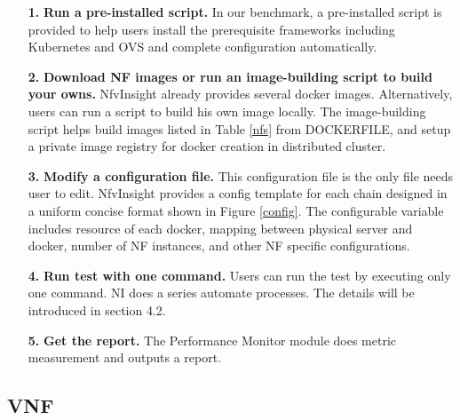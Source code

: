 \begin{itemize}
\item[\textbf{1.}]{}\textbf{Run a pre-installed script.}
In our benchmark, a pre-installed script is provided to
help users install the prerequisite frameworks including Kubernetes and OVS
and complete configuration automatically.

\item[\textbf{2.}]{}\textbf{Download NF images or run an image-building script to build your owns.}
NfvInsight already provides several docker images. Alternatively, users can run a script to build
his own image locally. The image-building script helps build images listed in Table \ref{nfs} from DOCKERFILE, and setup a private image registry for docker creation in distributed cluster.

\item[\textbf{3.}]{}\textbf{Modify a configuration file.}
This configuration file is the only file needs user to edit.
NfvInsight provides a config template for each chain
designed in a uniform concise format shown in Figure \ref{config}.
The configurable variable includes resource of each docker,
mapping between physical server and docker,
number of NF instances, and other NF specific configurations.

\item[\textbf{4.}]{}\textbf{Run test with one command.}
Users can run the test by executing only one command.
NI does a series automate processes.
The details will be introduced in section 4.2.

\item[\textbf{5.}]{}\textbf{Get the report.}
The Performance Monitor module does metric measurement
and outputs a report.

\end{itemize}


\subsection{VNF}

